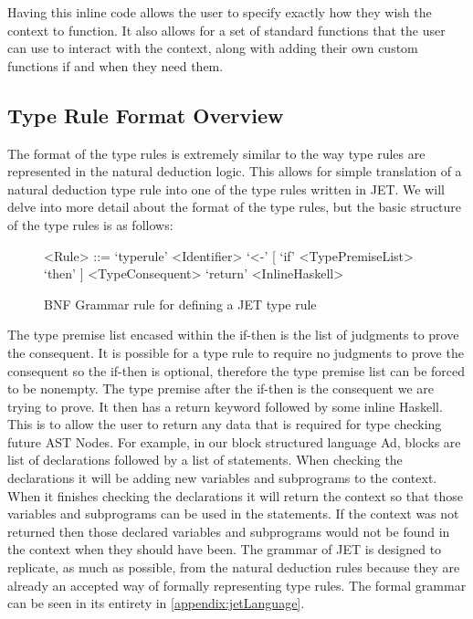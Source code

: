 Having this inline code allows the user to specify exactly how they wish the context to function.
It also allows for a set of standard functions that the user can use to interact with the context, along with adding their own custom functions if and when they need them.

\subsection{Type Rule Format Overview}
\label{sec:typeRuleOverview}
The format of the type rules is extremely similar to the way type rules are represented in the natural deduction logic.
This allows for simple translation of a natural deduction type rule into one of the type rules written in JET.
We will delve into more detail about the format of the type rules, but the basic structure of the type rules is as follows:

\begin{figure}[h]
    \begin{grammar}
        <Rule> ::= `typerule' <Identifier> `<-' [ `if' <TypePremiseList> `then' ] <TypeConsequent> `return' <InlineHaskell>
    \end{grammar}
    \caption{BNF Grammar rule for defining a JET type rule}
    \label{fig:bnfTypeRuleBasic}
\end{figure}


The type premise list encased within the if-then is the list of judgments to prove the consequent.
It is possible for a type rule to require no judgments to prove the consequent so the if-then is optional, therefore the type premise list can be forced to be nonempty.
The type premise after the if-then is the consequent we are trying to prove.
It then has a return keyword followed by some inline Haskell.
This is to allow the user to return any data that is required for type checking future AST Nodes.
For example, in our block structured language Ad, blocks are list of declarations followed by a list of statements.
When checking the declarations it will be adding new variables and subprograms to the context.
When it finishes checking the declarations it will return the context so that those variables and subprograms can be used in the statements.
If the context was not returned then those declared variables and subprograms would not be found in the context when they should have been.
The grammar of JET is designed to replicate, as much as possible, from the natural deduction rules because they are already an accepted way of formally representing type rules.
The formal grammar can be seen in its entirety in \autoref{appendix:jetLanguage}.

